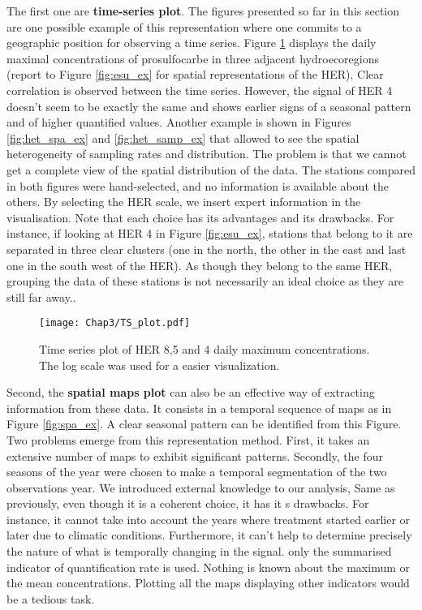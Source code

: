  The first one are \textbf{time-series plot}. The figures presented so far in this section are one possible example of this representation where one commits to a geographic position for observing a time series. Figure \ref{fig:tsplot_ex} displays the daily maximal concentrations of prosulfocarbe in three adjacent hydroecoregions (report to Figure \ref{fig:esu_ex} for spatial representations of the HER). Clear correlation is observed between the time series. However, the signal of HER 4 doesn't seem to be exactly the same and shows earlier signs of a seasonal pattern and of higher quantified values. Another example is shown in Figures \ref{fig:het_spa_ex} and \ref{fig:het_samp_ex} that allowed to see the spatial heterogeneity of sampling rates and distribution. The problem is that we cannot get a complete view of the spatial distribution of the data. The stations compared in both figures were hand-selected, and no information is available about the others. By selecting the HER scale, we insert expert information in the visualisation. Note that each choice has its advantages and its drawbacks. For instance, if looking at HER 4 in Figure \ref{fig:esu_ex}, stations that belong to it are separated in three clear clusters (one in the north, the other in the east and last one in the south west of the HER). As though they belong to the same HER, grouping the data of these stations is not necessarily an ideal choice as they are still far away.. 
 
 \begin{figure}[ht]
    \centering
    \texttt{[image: Chap3/TS\_plot.pdf]}
    \caption{Time series plot of HER 8,5 and 4 daily maximum concentrations. The log scale was used for a easier visualization.}
    \label{fig:tsplot_ex}
\end{figure}
 
 Second, the \textbf{spatial maps plot} can also be an effective way of extracting information from these data. It consists in a temporal sequence of maps as in Figure \ref{fig:spa_ex}. A clear seasonal pattern can be identified from this Figure. Two problems emerge from this representation method. First, it takes an extensive number of maps to exhibit significant patterns. Secondly, the four seasons of the year were chosen to make a temporal segmentation of the two observations year. We introduced external knowledge to our analysis, Same as previously, even though it is a coherent choice, it has it s drawbacks. For instance, it cannot take into account the years where treatment started earlier or later due to climatic conditions. Furthermore, it can't help to determine precisely the nature of what is temporally changing in the signal. only the summarised indicator of quantification rate is used. Nothing is known about the maximum or the mean concentrations. Plotting all the maps displaying other indicators would be a tedious task.   

